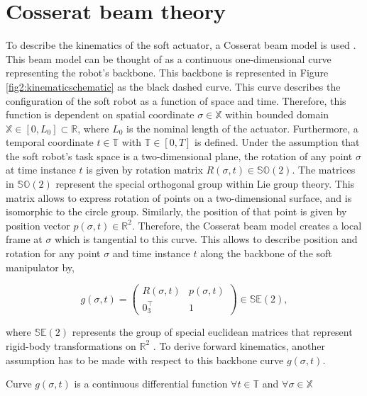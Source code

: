 \section{Cosserat beam theory}

To describe the kinematics of the soft actuator, a Cosserat beam model is used \cite{Boyer2019}. This beam model can be thought of as a continuous one-dimensional curve representing the robot's backbone. This backbone is represented in Figure \ref{fig2:kinematicschematic} as the black dashed curve. This curve describes the configuration of the soft robot as a function of space and time. Therefore, this function is dependent on spatial coordinate $\sigma \in \mathbb{X}$ within bounded domain $\mathbb{X} \in [0,L_0] \subset \mathbb{R}$, where $L_0$ is the nominal length of the actuator. Furthermore, a temporal coordinate $t \in \mathbb{T}$ with $\mathbb{T} \in [0,T]$ is defined. Under the assumption that the soft robot's task space is a two-dimensional plane, the rotation of any point $\sigma$ at time instance $t$ is given by rotation matrix $R(\sigma,t) \in \mathbb{SO}(2)$. The matrices in $\mathbb{SO}(2)$ represent the special orthogonal group within Lie group theory. This matrix allows to express rotation of points on a two-dimensional surface, and is isomorphic to the circle group. Similarly, the position of that point is given by position vector $p(\sigma,t) \in \mathbb{R}^2$. Therefore, the Cosserat beam model creates a local frame at $\sigma$ which is tangential to this curve. This allows to describe position and rotation for any point $\sigma$ and time instance $t$ along the backbone of the soft manipulator by,


\begin{equation}
    g(\sigma,t) = \begin{pmatrix}  R(\sigma,t) & p(\sigma,t) \\ 0_3^\top & 1 \end{pmatrix} \in \mathbb{SE}(2),
    \label{eq2:g}
\end{equation}

where $\mathbb{SE}(2)$ represents the group of special euclidean matrices that represent rigid-body transformations on $\mathbb{R}^2$ \cite{Sola2018}. To derive forward kinematics, another assumption has to be made with respect to this backbone curve $g(\sigma,t)$.

\begin{theorem}
Curve  $g(\sigma,t)$ is a continuous differential function $ \forall t \in 
\mathbb{T} $ and $\forall \sigma \in \mathbb{X}$
\end{theorem}

